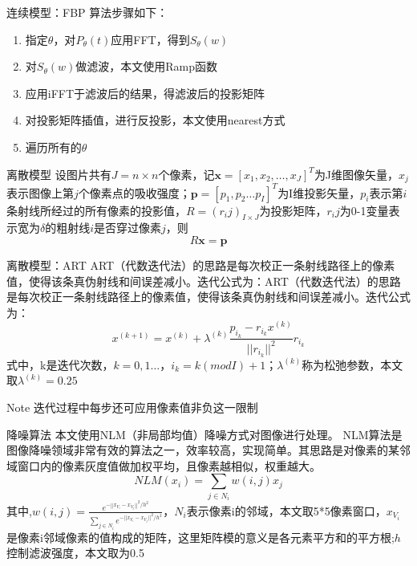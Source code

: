 \documentclass{beamer} %
\begin{document}
  
  
\begin{frame}{连续模型：FBP} 
	算法步骤如下：  
	\begin{enumerate}
		\item 指定$\theta$，对\(P_\theta (t)\)应用FFT，得到\(S_\theta (w)\)        
		\item 对\(S_\theta (w)\)做滤波，本文使用Ramp函数       
		\item 应用iFFT于滤波后的结果，得滤波后的投影矩阵   
		\item 对投影矩阵插值，进行反投影，本文使用nearest方式    
		\item 遍历所有的$\theta$    
	\end{enumerate}
\end{frame}

\begin{frame}{离散模型}  
	设图片共有\(J = n\times n\)个像素，记$\textbf{x}=[x_{1},x_{2} ,\ldots ,x_{J}]^T$为J维图像矢量，\(x_j\)表示图像上第\(j\)个像素点的吸收强度；$\textbf{p}=[p_{1},p_{2} \ldots p_{I}]^T$为I维投影矢量，$p_i$表示第\(i\)条射线所经过的所有像素的投影值，$R=(r_ij)_{I\times J}$为投影矩阵，\(r_ij\)为0-1变量表示宽为\(\delta\)的粗射线\(i\)是否穿过像素\(j\)，则	  
	\begin{equation}
		R\textbf{x}=\textbf{p}
	\end{equation}
\end{frame}
  
  
  
\begin{frame}{离散模型：ART}
	ART（代数迭代法）的思路是每次校正一条射线路径上的像素值，使得该条真伪射线和间误差减小。迭代公式为：ART（代数迭代法）的思路是每次校正一条射线路径上的像素值，使得该条真伪射线和间误差减小。迭代公式为：
	\begin{equation}
		x^{(k+1)}=x^{(k)}+\lambda^{(k)}\frac{p_{i_{k}}-r_{i_{k}}x^{(k)}}{||r_{i_{k}}||^{2}}r_{i_{k}}
	\end{equation}
	式中，k是迭代次数，$k=0,1 \ldots$，$i_{k}=k(modI)+1$；$\lambda^{(k)}$称为松弛参数，本文取$\lambda^{(k)}=0.25$
	\begin{alertblock}{Note}
		迭代过程中每步还可应用像素值非负这一限制
	\end{alertblock}
\end{frame}
  
\begin{frame}{降噪算法}
	本文使用NLM（非局部均值）降噪方式对图像进行处理。 NLM算法是图像降噪领域非常有效的算法之一，效率较高，实现简单。其思路是对像素的某邻域窗口内的像素灰度值做加权平均，且像素越相似，权重越大。
	\begin{equation}
		NLM(x_{i})=\sum_{j\in N_{i}} w(i,j)x_{j}
	\end{equation}
	其中,\(w(i,j)=\frac{e^{-||x_{V_{i}}-x_{V_{j}}||^2/h^2}}{\sum_{j\in N_{i}}e^{-||x_{V_{i}}-x_{V_{j}}||^2/h^2}}\)，$N_{i}$表示像素i的邻域，本文取5*5像素窗口，$x_{V_{i}}$是像素i邻域像素的值构成的矩阵，这里矩阵模的意义是各元素平方和的平方根;$h$控制滤波强度，本文取为0.5
\end{frame}
  
\end{document}
